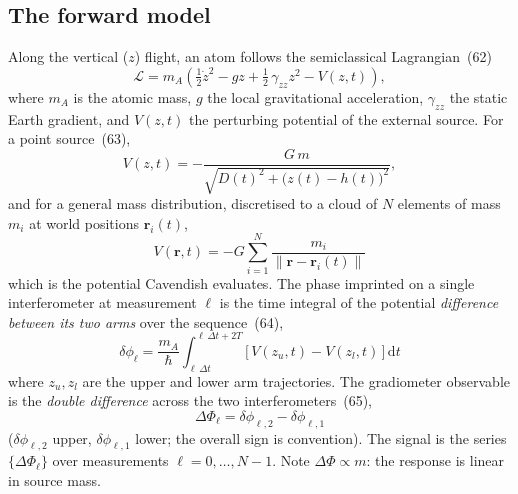 \documentclass[11pt,a4paper]{article}
\theoremstyle{reqstyle}
\newcommand{\rv}{\mathbf{r}}
\newcommand{\dd}{\,\mathrm{d}}
\newcommand{\half}{\tfrac{1}{2}}
\begin{document}
\subsection{The forward model}
\label{sec:forward}
Along the vertical ($z$) flight, an atom follows the semiclassical Lagrangian~(62)
\begin{equation}
\mathcal{L} = m_A\!\left( \half \dot z^2 - g z + \half\,\gamma_{zz} z^2 - V(z,t) \right),
\end{equation}
where $m_A$ is the atomic mass, $g$ the local gravitational acceleration, $\gamma_{zz}$ the
static Earth gradient, and $V(z,t)$ the perturbing potential of the external source. For a
point source~(63),
\begin{equation}
V(z,t) = -\frac{G\,m}{\sqrt{D(t)^2 + \big(z(t)-h(t)\big)^2}},
\end{equation}
and for a general mass distribution, discretised to a cloud of $N$ elements of mass $m_i$
at world positions $\rv_i(t)$,
\begin{equation}
\boxed{\;V(\rv,t) = -G\sum_{i=1}^{N}\frac{m_i}{\lVert \rv - \rv_i(t)\rVert}\;}
\label{eq:cloudpot}
\end{equation}
which is the potential Cavendish evaluates. The phase imprinted on a single interferometer
at measurement $\ell$ is the time integral of the potential \emph{difference between its two
arms} over the sequence~(64),
\begin{equation}
\boxed{\;
\delta\phi_\ell = \frac{m_A}{\hbar}
\int_{\ell\,\Delta t}^{\ell\,\Delta t + 2T}
\big[\, V(z_u,t) - V(z_l,t)\,\big]\dd t \;}
\label{eq:singlephi}
\end{equation}
where $z_u,z_l$ are the upper and lower arm trajectories. The gradiometer observable is the
\emph{double difference} across the two interferometers~(65),
\begin{equation}
\boxed{\;\Delta\Phi_\ell = \delta\phi_{\ell,2} - \delta\phi_{\ell,1}\;}
\label{eq:doublediff}
\end{equation}
($\delta\phi_{\ell,2}$ upper, $\delta\phi_{\ell,1}$ lower; the overall sign is convention).
The signal is the series $\{\Delta\Phi_\ell\}$ over measurements $\ell = 0,\dots,N-1$. Note
$\Delta\Phi \propto m$: the response is linear in source mass.
\end{document}
